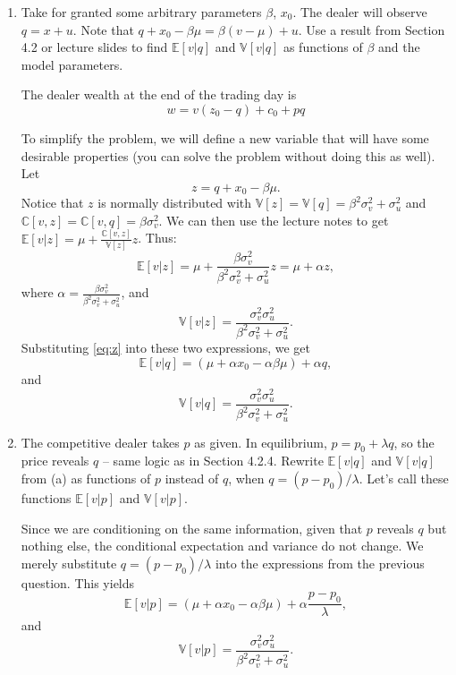\documentclass[11pt
, answers
]{exam}
\begin{document}
\begin{enumerate}[label=(\alph*). ]
\item Take for granted some arbitrary parameters $\beta$, $x_{0}$. The dealer will observe $q=x+u$. Note that $q+x_{0}-\beta \mu = \beta(v-\mu)+u$. Use a result from Section 4.2 or lecture slides to find $\mathbb{E}[v|q]$ and $\mathbb{V}[v|q]$ as functions of $\beta$ and the model parameters.

\begin{solution}
The dealer wealth at the end of the trading day is
\[
w = v(z_{0}-q) + c_{0} + pq
\]

To simplify the problem, we will define a new variable that will have some desirable properties (you can solve the problem without doing this as well). Let 
\begin{equation} \label{eq:z}
z=q+x_{0}-\beta \mu.
\end{equation}
 Notice that $z$ is normally distributed with $\mathbb{V}[z]=\mathbb{V}[q]=\beta^{2}\sigma^{2}_{v}+\sigma^{2}_{u}$ and $\mathbb{C}[v,z]=\mathbb{C}[v,q]=\beta \sigma^{2}_{v}$. We can then use the lecture notes to get $\mathbb{E}[v|z]=\mu+\frac{\mathbb{C}[v,z]}{\mathbb{V}[z]}z$. Thus:
\[
\mathbb{E}[v|z] = \mu+\frac{\beta \sigma^{2}_{v}}{\beta^{2}\sigma^{2}_{v}+\sigma^{2}_{u}} z =\mu + \alpha z,
\]
where $\alpha = \frac{\beta \sigma^{2}_{v}}{\beta^{2}\sigma^{2}_{v}+\sigma^{2}_{u}}$, and
\[
\mathbb{V}[v|z]=\frac{\sigma^{2}_{v}\sigma_{u}^{2}}{\beta^{2}\sigma^{2}_{v}+\sigma^{2}_{u}}.
\]
Substituting \eqref{eq:z} into these two expressions, we get 
\[
\mathbb{E}[v|q] = (\mu + \alpha x_{0} - \alpha \beta \mu)  + \alpha q,
\]
and 
\[
\mathbb{V}[v|q]=\frac{\sigma^{2}_{v}\sigma_{u}^{2}}{\beta^{2}\sigma^{2}_{v}+\sigma^{2}_{u}}.
\]
\end{solution}


\item The competitive dealer takes $p$ as given. In equilibrium, $p=p_{0}+\lambda q$, so the price reveals $q$ -- same logic as in Section 4.2.4. Rewrite $\mathbb{E}[v|q]$ and $\mathbb{V}[v|q]$ from (a) as functions of $p$ instead of $q$, when $q=(p-p_{0})/\lambda$. Let's call these functions $\mathbb{E}[v|p]$ and $\mathbb{V}[v|p]$.

\begin{solution}
Since we are conditioning on the same information, given that $p$ reveals $q$ but nothing else, the conditional expectation and variance do not change. We merely substitute $q=(p-p_{0})/\lambda$ into the expressions from the previous question. This yields
\[
\mathbb{E}[v|p] =  (\mu + \alpha x_{0} - \alpha \beta \mu) +\alpha \frac{p-p_{0}}{\lambda},
\]
and
\[
\mathbb{V}[v|p]=\frac{\sigma^{2}_{v}\sigma_{u}^{2}}{\beta^{2}\sigma^{2}_{v}+\sigma^{2}_{u}}.
\]
\end{solution}


\end{enumerate}
\end{document}
